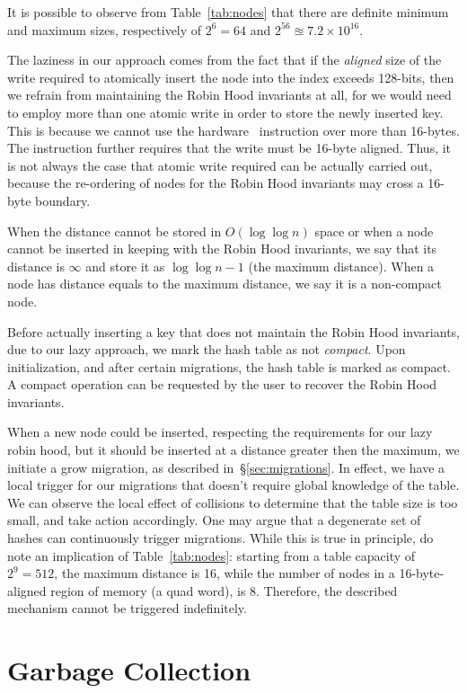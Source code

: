 It is possible to observe from Table~\ref{tab:nodes} that there are definite minimum and maximum sizes, respectively of $2^{6} = 64$ and $2^{56} \approxeq 7.2 \times 10^{16}$.

The laziness in our approach comes from the fact that if the \emph{aligned} size of the write required to atomically insert the node into the index exceeds 128-bits, then we refrain from maintaining the Robin Hood invariants at all, for we would need to employ more than one atomic write in order to store the newly inserted key.
This is because we cannot use the hardware~\cite[CMPXCHG--Compare and Exchange]{x86-64} instruction over more than 16-bytes.
The instruction further requires that the write must be 16-byte aligned.
Thus, it is not always the case that atomic write required can be actually carried out, because the re-ordering of nodes for the Robin Hood invariants may cross a 16-byte boundary.

When the distance cannot be stored in $O(\log \log n)$ space or when a node cannot be inserted in keeping with the Robin Hood invariants, we say that its distance is $\infty$ and store it as $\log \log n - 1$ (the maximum distance).
When a node has distance equals to the maximum distance, we say it is a non-compact node.

Before actually inserting a key that does not maintain the Robin Hood invariants, due to our lazy approach, we mark the hash table as not \emph{compact}.
Upon initialization, and after certain migrations, the hash table is marked as compact.
A compact operation can be requested by the user to recover the Robin Hood invariants.

When a new node could be inserted, respecting the requirements for our lazy robin hood, but it should be inserted at a distance greater then the maximum, we initiate a grow migration, as described in~\S\ref{sec:migrations}.
In effect, we have a local trigger for our migrations that doesn't require global knowledge of the table.
We can observe the local effect of collisions to determine that the table size is too small, and take action accordingly.
One may argue that a degenerate set of hashes can continuously trigger migrations.
While this is true in principle, do note an implication of Table~\ref{tab:nodes}: starting from a table capacity of $2^9 = 512$, the maximum distance is 16, while the number of nodes in a 16-byte-aligned region of memory (a quad word), is 8.
Therefore, the described mechanism cannot be triggered indefinitely.


\section{Garbage Collection}\label{sec:garbage-collection}

